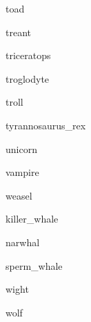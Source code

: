 \documentclass[letterpaper,serif]{module}
\begin{document}
\begin{newmonster}{toad}\end{newmonster}

\begin{newmonster}{treant}\end{newmonster}

\begin{newmonster}{triceratops}\end{newmonster}

\begin{newmonster}{troglodyte}\end{newmonster}

\begin{newmonster}{troll}\end{newmonster}

\begin{newmonster}{tyrannosaurus_rex}\end{newmonster}

\begin{newmonster}{unicorn}\end{newmonster}

\begin{newmonster}{vampire}\end{newmonster}

\begin{newmonster}{weasel}\end{newmonster}

\begin{newmonster}{killer_whale}\end{newmonster}

\begin{newmonster}{narwhal}\end{newmonster}

\begin{newmonster}{sperm_whale}\end{newmonster}

\begin{newmonster}{wight}\end{newmonster}

\begin{newmonster}{wolf}\end{newmonster}
\end{document}

